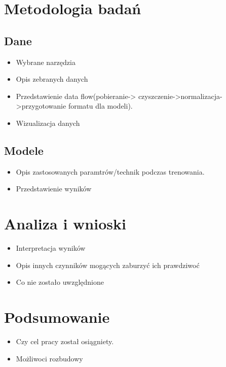 \chapter{Metodologia badań}
\label{cha:pierwszyDokument}

\section{Dane}
\label{cha:pierwszyDokument}

\begin{itemize}
\item Wybrane narzędzia
\item Opis zebranych danych
\item Przedstawienie data flow(pobieranie-> czyszczenie->normalizacja->przygotowanie formatu dla modeli).
\item Wizualizacja danych
\end{itemize}


\section{Modele }
\label{cha:pierwszyDokument}

\begin{itemize}
\item Opis zastosowanych paramtrów/technik podczas trenowania.
\item Przedstawienie wyników 
\end{itemize}


\chapter{Analiza i wnioski }
\label{cha:pierwszyDokument}

\begin{itemize}
\item Interpretacja wyników
\item Opis innych czynników mogących zaburzyć ich prawdziwoć
\item Co nie zostało uwzględnione 
\end{itemize}


\chapter{Podsumowanie}
\label{cha:pierwszyDokument}

\begin{itemize}
\item Czy cel pracy został osiągniety.
\item Możliwoci rozbudowy
\end{itemize}
 




